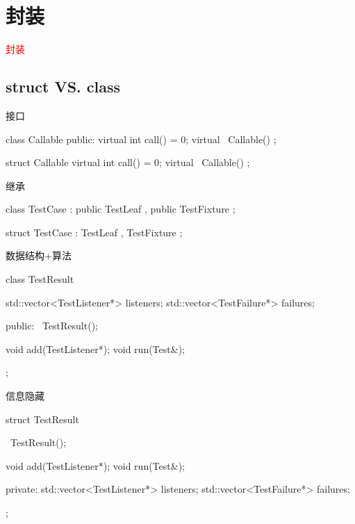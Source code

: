 \section{封装}
\label{sec:class}

\begin{frame}
  \begin{center}
    \Huge{\textcolor{red}{封装}}
  \end{center}
\end{frame}

\subsection{struct VS. class}

\begin{frame}[fragile]{接口}
  \begin{c++}
class Callable {
public:
  virtual int call() = 0;
  virtual ~Callable() {} 
};

struct Callable {
  virtual int call() = 0;
  virtual ~Callable() {} 
};
  \end{c++}
\end{frame}

\begin{frame}[fragile]{继承}
  \begin{c++}
class  TestCase
  : public TestLeaf
  , public TestFixture 
{
};

struct TestCase 
  : TestLeaf 
  , TestFixture 
{
};
  \end{c++}
\end{frame}

\begin{frame}[fragile]{数据结构+算法}
  \begin{c++}
class TestResult {
  std::vector<TestListener*> listeners;
  std::vector<TestFailure*>  failures;

public:
  ~TestResult();

  void add(TestListener*);
  void run(Test&);
};
  \end{c++}
\end{frame}

\begin{frame}[fragile]{信息隐藏}
  \begin{c++}
struct TestResult {
  ~TestResult();

  void add(TestListener*);
  void run(Test&);

private:
  std::vector<TestListener*> listeners;
  std::vector<TestFailure*>  failures;
};
  \end{c++}
\end{frame}

